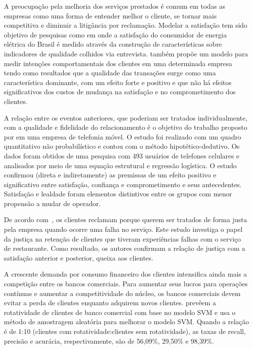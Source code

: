 \documentclass[../main.tex]{subfiles}
\begin{document}
A preocupação pela melhoria dos serviços prestados é comum em todas as empresas como uma forma de entender melhor o cliente, se tornar mais competitiva e diminuir a litigância por reclamação. Modelar a satisfação tem sido objetivo de pesquisas como em  onde a satisfação do consumidor de energia elétrica do Brasil é medido através da construção de características sobre indicadores de qualidade colhidos via entrevista.  também propõe um modelo para medir intenções comportamentais dos clientes em uma determinada empresa tendo como resultados que a qualidade das transações surge como uma característica dominante, com um efeito forte e positivo e que não há efeitos significativos dos custos de mudança na satisfação e no comprometimento dos clientes.


A relação entre os eventos anteriores, que poderiam ser tratados individualmente, com a qualidade e fidelidade do relacionamento é o objetivo do trabalho proposto por  em uma empresa de telefonia móvel. O estudo foi realizado com um quadro quantitativo não probabilístico e contou com o método hipotético-dedutivo. Os dados foram obtidos de uma pesquisa com 493 usuários de telefones celulares e analisados por meio de uma equação estrutural e regressão logística. O estudo confirmou (direta e indiretamente) as premissas de um efeito positivo e significativo entre satisfação, confiança e comprometimento e seus antecedentes. Satisfação e lealdade foram elementos distintivos entre os grupos com menor propensão a mudar de operador.

De acordo com~, os clientes reclamam porque querem ser tratados de forma justa pela empresa quando ocorre uma falha no serviço. Este estudo investiga o papel da justiça na retenção de clientes que tiveram experiências falhas com o serviço de restaurante. Como resultado, os autores confirmam a relação de justiça com a satisfação anterior e posterior, queixa aos clientes.


A crescente demanda por consumo financeiro dos clientes intensifica ainda mais a competição entre os bancos comerciais. Para aumentar seus lucros para operações contínuas e aumentar a competitividade do núcleo, os bancos comerciais devem evitar a perda de clientes enquanto adquirem novos clientes.  prevêem a rotatividade de clientes de banco comercial com base no modelo SVM e usa o método de amostragem aleatória para melhorar o modelo SVM. Quando a relação é de 1:10 (clientes com rotatividade:clientes sem rotatividade), as taxas de recall, precisão e acurácia, respectivamente, são de 56,09\%, 29,50\% e 98,39\%.
\end{document}
